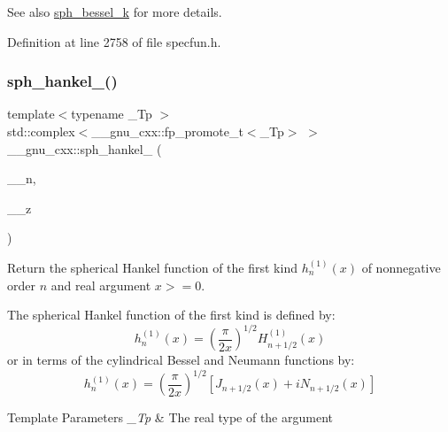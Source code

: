 \begin{DoxySeeAlso}{See also}
\hyperlink{group__gnu__math__spec__func_ga288b28f2c6995d052a4f5f17293cbf1a}{sph\+\_\+bessel\+\_\+k} for more details. 
\end{DoxySeeAlso}


Definition at line 2758 of file specfun.\+h.

\mbox{\label{group__gnu__math__spec__func_ga4424f565fb224ab88b177beb65d08305}} 
\subsubsection{\texorpdfstring{sph\+\_\+hankel\+\_()}{sph\_hankel\_1()}\hspace{0.1cm}{\footnotesize\ttfamily [1/2]}}
{\footnotesize\ttfamily template$<$typename \+\_\+\+Tp $>$ \\
std\+::complex$<$\+\_\+\+\_\+gnu\+\_\+cxx\+::fp\+\_\+promote\+\_\+t$<$\+\_\+\+Tp$>$ $>$ \+\_\+\+\_\+gnu\+\_\+cxx\+::sph\+\_\+hankel\+\_ (\begin{DoxyParamCaption}\item[{unsigned int}]{\+\_\+\+\_\+n,  }\item[{\+\_\+\+Tp}]{\+\_\+\+\_\+z }\end{DoxyParamCaption})\hspace{0.3cm}{\ttfamily [inline]}}

Return the spherical Hankel function of the first kind $ h^{(1)}_n(x) $ of nonnegative order $ n $ and real argument $ x >= 0 $.

The spherical Hankel function of the first kind is defined by\+: \[ h^{(1)}_n(x) = \left(\frac{\pi}{2x} \right) ^{1/2} H^{(1)}_{n+1/2}(x) \] or in terms of the cylindrical Bessel and Neumann functions by\+: \[ h^{(1)}_n(x) = \left(\frac{\pi}{2x} \right) ^{1/2} \left[ J_{n+1/2}(x) + iN_{n+1/2}(x) \right] \]


\begin{DoxyTemplParams}{Template Parameters}
{\em \+\_\+\+Tp} & The real type of the argument \\
\hline
\end{DoxyTemplParams}

